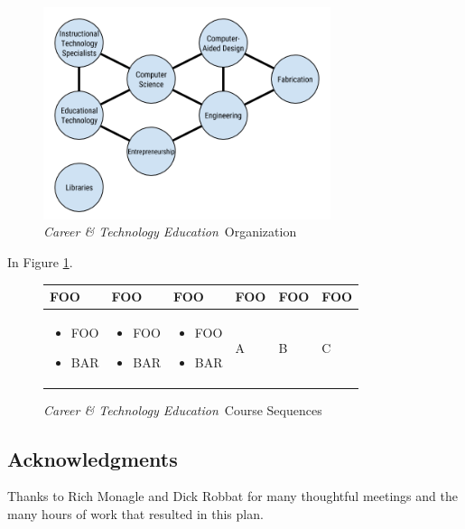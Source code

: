 \documentclass[11pt]{article}%
\def\docname{Career \& Technology Education}%
\def\cte{\textit{\docname}}
\begin{document}
\begin{figure}[H]\centering\includegraphics*[width = 0.75\textwidth]{./cte-organization.png}\caption[\textit{CTE} Organization]{\cte\ Organization}\label{fig-organization}\end{figure}

\begin{multicols}{2}
\lipsum[1-2] In Figure \ref{fig-organization}.
\end{multicols}

\begin{figure}[H]\centering
 \begin{tabu}to\textwidth{X | X | X | X | X | X}
  \textbf{FOO} & \textbf{FOO} & \textbf{FOO} & \textbf{FOO} & \textbf{FOO} & \textbf{FOO} \\\hline
  \begin{itemize}
   \item FOO
   \item BAR
  \end{itemize} &
  \begin{itemize}
   \item FOO
   \item BAR
  \end{itemize} &
  \begin{itemize}
   \item FOO
   \item BAR
  \end{itemize} &
  A & B & C
 \end{tabu}
 \caption[\textit{CTE} Courses]{\cte\ Course Sequences}\label{fig-courses}
\end{figure}

\begin{multicols}{2}
\section{Acknowledgments}
Thanks to Rich Monagle and Dick Robbat for many thoughtful meetings and the many hours of work that resulted in this plan.

\listoffigures
\end{multicols}
\end{document}

